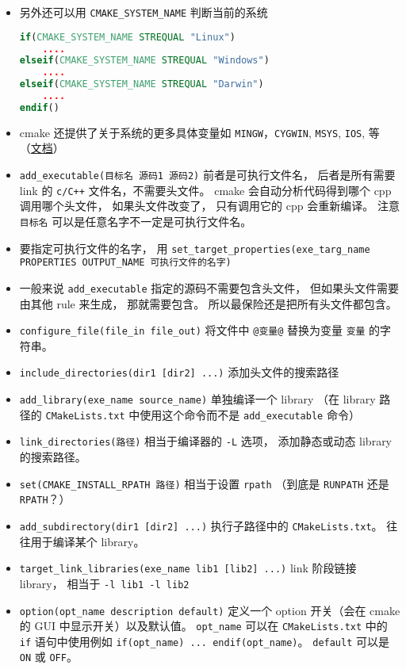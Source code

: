 \begin{itemize}
\item 另外还可以用 \verb`CMAKE_SYSTEM_NAME` 判断当前的系统
\begin{lstlisting}[language=cmake]
if(CMAKE_SYSTEM_NAME STREQUAL "Linux")
    ....
elseif(CMAKE_SYSTEM_NAME STREQUAL "Windows")
    ....
elseif(CMAKE_SYSTEM_NAME STREQUAL "Darwin")
    ....
endif()
\end{lstlisting}
\item cmake 还提供了关于系统的更多具体变量如 \verb`MINGW`，\verb`CYGWIN`, \verb`MSYS`, \verb`IOS`, 等（\href{https://cmake.org/cmake/help/latest/manual/cmake-variables.7.html}{文档}）
\item \verb`add_executable(目标名 源码1 源码2)` 前者是可执行文件名， 后者是所有需要 link 的 \verb`c/C++` 文件名，不需要头文件。 cmake 会自动分析代码得到哪个 cpp 调用哪个头文件， 如果头文件改变了， 只有调用它的 cpp 会重新编译。 注意 \verb`目标名` 可以是任意名字不一定是可执行文件名。
\item 要指定可执行文件的名字， 用 \verb`set_target_properties(exe_targ_name PROPERTIES OUTPUT_NAME 可执行文件的名字)`
\item 一般来说 \verb`add_executable` 指定的源码不需要包含头文件， 但如果头文件需要由其他 rule 来生成， 那就需要包含。 所以最保险还是把所有头文件都包含。
\item \verb`configure_file(file_in file_out)` 将文件中 \verb`@变量@` 替换为变量 \verb`变量` 的字符串。
\item \verb`include_directories(dir1 [dir2] ...)` 添加头文件的搜索路径
\item \verb`add_library(exe_name source_name)` 单独编译一个 library （在 library 路径的 \verb`CMakeLists.txt` 中使用这个命令而不是 \verb`add_executable` 命令）
\item \verb`link_directories(路径)` 相当于编译器的 \verb`-L` 选项， 添加静态或动态 library 的搜索路径。
\item \verb`set(CMAKE_INSTALL_RPATH 路径)` 相当于设置 \verb`rpath` （到底是 \verb`RUNPATH` 还是 \verb`RPATH`？）
\item \verb`add_subdirectory(dir1 [dir2] ...)` 执行子路径中的 \verb`CMakeLists.txt`。 往往用于编译某个 library。
\item \verb`target_link_libraries(exe_name lib1 [lib2] ...)` link 阶段链接 library， 相当于 \verb`-l lib1 -l lib2`
\item \verb`option(opt_name description default)` 定义一个 option 开关（会在 cmake 的 GUI 中显示开关）以及默认值。 \verb`opt_name` 可以在 \verb`CMakeLists.txt` 中的 \verb`if` 语句中使用例如 \verb`if(opt_name) ... endif(opt_name)`。 \verb`default` 可以是 \verb`ON` 或 \verb`OFF`。

\end{itemize}

